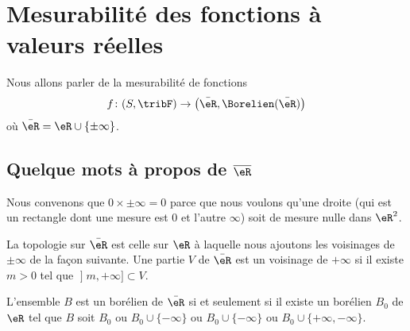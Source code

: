 \section{Mesurabilité des fonctions à valeurs réelles}

Nous allons parler de la mesurabilité de fonctions
\begin{equation}
    f\colon (S,\tribF)\to \big( \bar \eR,\Borelien(\bar \eR) \big)
\end{equation}
où \( \bar \eR=\eR\cup\{ \pm\infty \}\).

\subsection{Quelque mots à propos de $\overline{ \eR }$}        %

\begin{normaltext}      \label{normooGAAJooUPCbzG}
Nous convenons que \( 0\times\pm\infty=0\) parce que nous voulons qu'une droite (qui est un rectangle dont une mesure est \( 0\) et l'autre \( \infty\)) soit de mesure nulle dans \( \eR^2\).
\end{normaltext}

\begin{definition}
La topologie sur \(\bar \eR\) est celle sur \( \eR\) à laquelle nous ajoutons les voisinages de \( \pm\infty\) de la façon suivante. Une partie \( V\) de \( \bar \eR\) est un voisinage de \( +\infty\) si il existe \( m>0\) tel que \( \mathopen] m , +\infty \mathclose]\subset V\).
\end{definition}

\begin{lemma}       \label{LEMooBLOLooAdNViv}
    L'ensemble \( B\) est un borélien de \( \bar \eR\) si et seulement si il existe un borélien \( B_0\) de \( \eR\) tel que \( B\) soit \( B_0\) ou \( B_0\cup\{ -\infty \}\) ou \( B_0\cup\{ -\infty \}\) ou \( B_0\cup\{ +\infty,-\infty \}\).
\end{lemma}

